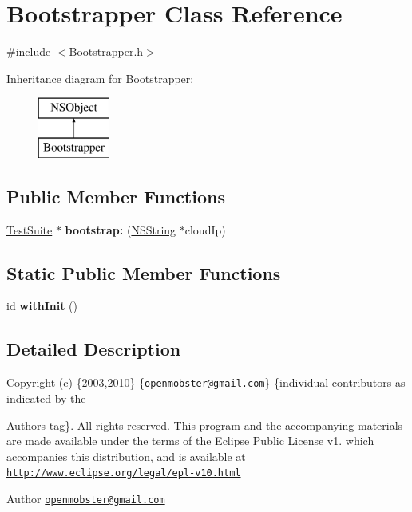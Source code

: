\hypertarget{interface_bootstrapper}{
\section{\-Bootstrapper \-Class \-Reference}
\label{interface_bootstrapper}
}


{\ttfamily \#include $<$\-Bootstrapper.\-h$>$}

\-Inheritance diagram for \-Bootstrapper\-:\begin{figure}[H]
\begin{center}
\leavevmode
\includegraphics[height=2.000000cm]{interface_bootstrapper}
\end{center}
\end{figure}
\subsection*{\-Public \-Member \-Functions}
\begin{DoxyCompactItemize}
\item 
\hypertarget{interface_bootstrapper_a150721e26d50eb956298b54beccc8080}{
\hyperlink{interface_test_suite}{\-Test\-Suite} $\ast$ {\bfseries bootstrap\-:} (\hyperlink{class_n_s_string}{\-N\-S\-String} $\ast$cloud\-Ip)}
\label{interface_bootstrapper_a150721e26d50eb956298b54beccc8080}

\end{DoxyCompactItemize}
\subsection*{\-Static \-Public \-Member \-Functions}
\begin{DoxyCompactItemize}
\item 
\hypertarget{interface_bootstrapper_ac845b5e340119554ac5d53e5972a6e47}{
id {\bfseries with\-Init} ()}
\label{interface_bootstrapper_ac845b5e340119554ac5d53e5972a6e47}

\end{DoxyCompactItemize}


\subsection{\-Detailed \-Description}
\-Copyright (c) \{2003,2010\} \{\href{mailto:openmobster@gmail.com}{\tt openmobster@gmail.\-com}\} \{individual contributors as indicated by the \begin{DoxyAuthor}{\-Authors}
tag\}. \-All rights reserved. \-This program and the accompanying materials are made available under the terms of the \-Eclipse \-Public \-License v1. which accompanies this distribution, and is available at \href{http://www.eclipse.org/legal/epl-v10.html}{\tt http\-://www.\-eclipse.\-org/legal/epl-\/v10.\-html}
\end{DoxyAuthor}
\begin{DoxyAuthor}{\-Author}
\href{mailto:openmobster@gmail.com}{\tt openmobster@gmail.\-com} 
\end{DoxyAuthor}



